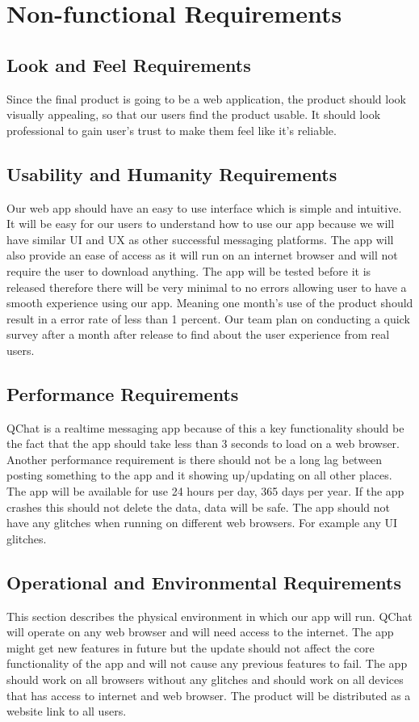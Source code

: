 \documentclass[12pt, titlepage]{article}
\begin{document}
\section{Non-functional Requirements}

\subsection{Look and Feel Requirements}
Since the final product is going to be a web application, the product should look visually appealing, so that our users find the product usable. It should look professional to gain user’s trust to make them feel like it's reliable.

\subsection{Usability and Humanity Requirements}
Our web app should have an easy to use interface which is simple and intuitive. It will be easy for our users to understand how to use our app because we will have similar UI and UX as other successful messaging platforms. The app will also provide an ease of access as it will run on an internet browser and will not require the user to download anything. The app will be tested before it is released therefore there will be very minimal to no errors allowing user to have a smooth experience using our app. Meaning one month’s use of the product should result in a error rate of less than 1 percent. 
Our team plan on conducting a quick survey after a month after release to find about the user experience from real users. 


\subsection{Performance Requirements}
QChat is a realtime messaging app because of this a key functionality should be the fact that the app should take less than 3 seconds to load on a web browser. Another performance requirement is there should not be a long lag between posting something to the app and it showing up/updating on all other places. The app will be available for use 24 hours per day, 365 days per year. If the app crashes this should not delete the data, data will be safe. The app should not have any glitches when running on different web browsers. For example any UI glitches. 

\subsection{Operational and Environmental Requirements}
This section describes the physical environment in which our app will run. QChat will operate on any web browser and will need access to the internet. The app might get new features in future but the update should not affect the core functionality of the app and will not cause any previous features to fail. The app should work on all browsers without any glitches and should work on all devices that has access to internet and web browser. The product will be distributed as a website link to all users. 
\end{document}

